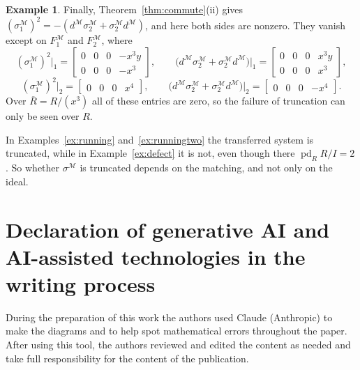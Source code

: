 \documentclass[12pt]{amsart}
\theoremstyle{plain}
\theoremstyle{definition}
\newtheorem{example}[theorem]{Example}
\newcommand{\Rbar}{\overline{R}}
\newcommand{\M}{\mathcal{M}}
\newcommand{\pd}{\operatorname{pd}}
\begin{document}
\begin{example}
    Finally, Theorem~\ref{thm:commute}(ii) gives $(\sigma^{\M}_1)^2 = -(d^{\M} \sigma^{\M}_2 + \sigma^{\M}_2 d^{\M})$, and here both sides are nonzero. They vanish except on $F^{\M}_1$ and $F^{\M}_2$, where
    \[
        (\sigma^{\M}_1)^2|_1 = \begin{bmatrix} 0 & 0 & 0 & -x^3y\\ 0 & 0 & 0 & -x^3 \end{bmatrix}, \qquad
        \bigl(d^{\M} \sigma^{\M}_2 + \sigma^{\M}_2 d^{\M}\bigr)\big|_1 = \begin{bmatrix} 0 & 0 & 0 & x^3y\\ 0 & 0 & 0 & x^3 \end{bmatrix},
    \]
    \[
        (\sigma^{\M}_1)^2|_2 = \begin{bmatrix} 0 & 0 & 0 & x^4 \end{bmatrix}, \qquad
        \bigl(d^{\M} \sigma^{\M}_2 + \sigma^{\M}_2 d^{\M}\bigr)\big|_2 = \begin{bmatrix} 0 & 0 & 0 & -x^4 \end{bmatrix}.
    \]
    Over $\Rbar = R/(x^3)$ all of these entries are zero, so the failure of truncation can only be seen over $R$.
\end{example}

In Examples~\ref{ex:running} and~\ref{ex:runningtwo} the transferred system is truncated, while in Example~\ref{ex:defect} it is not, even though there $\pd_R R/I = 2$. So whether $\sigma^{\M}$ is truncated depends on the matching, and not only on the ideal.

\section*{Declaration of generative AI and AI-assisted technologies in the writing process}
During the preparation of this work the authors used Claude (Anthropic) to make the diagrams and to help spot mathematical errors throughout the paper. After using this tool, the authors reviewed and edited the content as needed and take full responsibility for the content of the publication.



\end{document}
